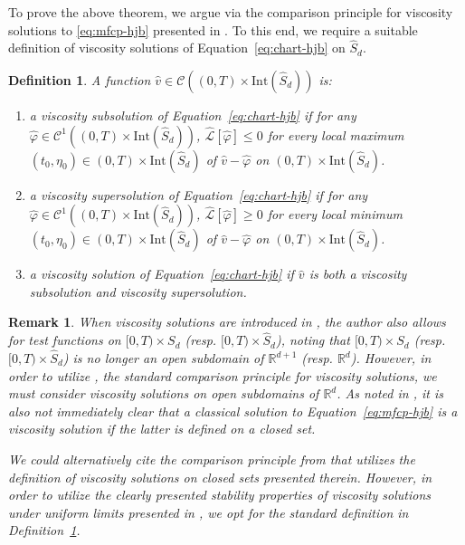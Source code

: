 \documentclass[11pt,reqno]{amsart}
\numberwithin{equation}{section}
\theoremstyle{plain}
\newtheorem{definition}[theorem]{Definition}
\newtheorem{remark}[theorem]{Remark}
\newcommand{\R}{\mathbb{R}}
\newcommand{\sC}{\mathcal{C}}
\newcommand{\intr}{\text{Int}}
\begin{document}
To prove the above theorem, we argue via the comparison principle for viscosity solutions to \eqref{eq:mfcp-hjb} presented in \cite{mfcp}. To this end, we require a suitable definition of viscosity solutions of Equation~\eqref{eq:chart-hjb} on $\widehat{S}_d$.
\begin{definition}
\label{def:visc-solutions}
A function $\widehat{v} \in \sC((0, T) \times \intr(\widehat{S}_d))$ is: 
\begin{enumerate}
\item[(i)] a viscosity subsolution of Equation~\eqref{eq:chart-hjb} if for any $\widehat{\varphi} \in \sC^1((0, T) \times \intr(\widehat{S}_d))$, $\widehat{\mathcal{L}}[\widehat{\varphi}] \leq 0$
for every local maximum $(t_0, \eta_0) \in (0, T) \times \intr(\widehat{S}_d)$ of $\widehat{v} - \widehat{\varphi}$ on $(0, T) \times \intr(\widehat{S}_d)$.
\item[(ii)] a viscosity supersolution of Equation~\eqref{eq:chart-hjb} if for any $\widehat{\varphi} \in \sC^1((0, T) \times \intr(\widehat{S}_d))$, $\widehat{\mathcal{L}}[\widehat{\varphi}] \geq 0$
for every local minimum $(t_0, \eta_0) \in (0, T) \times \intr(\widehat{S}_d)$ of $\widehat{v} - \widehat{\varphi}$ on $(0, T) \times \intr(\widehat{S}_d)$.
\item[(iii)] a viscosity solution of Equation~\eqref{eq:chart-hjb} if $\widehat{v}$ is both a viscosity subsolution and viscosity supersolution.
\end{enumerate}
\end{definition}
\begin{remark}
\normalfont
When viscosity solutions are introduced in \cite{mfcp}, the author also allows for test functions on $[0, T) \times S_d$ (resp. $[0, T) \times \widehat{S}_d$), noting that $[0, T) \times S_d$ (resp. $[0, T) \times \widehat{S}_d$) is no longer an open subdomain of $\R^{d+1}$ (resp. $\R^d$). However, in order to utilize \cite[Theorem 3.3]{visc-users}, the standard comparison principle for viscosity solutions, we must consider viscosity solutions on open subdomains of $\R^{d}$. As noted in \cite{mfcp}, it is also not immediately clear that a classical solution to Equation~\eqref{eq:mfcp-hjb} is a viscosity solution if the latter is defined on a closed set.

We could alternatively cite the comparison principle from \cite[Theorem 3.4]{mfcp} that utilizes the definition of viscosity solutions on closed sets presented therein. However, in order to utilize the clearly presented stability properties of viscosity solutions under uniform limits presented in \cite{ crandall-evans-lions, visc-users}, we opt for the standard definition in Definition~\ref{def:visc-solutions}.
\end{remark}
\end{document}

